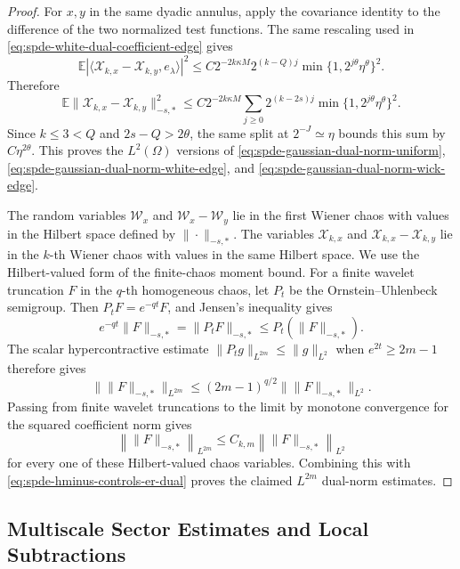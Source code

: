\begin{proof}
For \(x,y\) in the same dyadic annulus, apply the covariance identity to the
difference of the two normalized test functions.  The same rescaling used in
\eqref{eq:spde-white-dual-coefficient-edge} gives
\begin{equation}
  \mathbb E
  \left|
    \langle\mathcal X_{k,x}-\mathcal X_{k,y},e_\lambda\rangle
  \right|^2
  \leq
  C2^{-2k\kappa M}2^{(k-Q)j}
  \min\{1,2^{j\theta}\eta^\theta\}^2 .
  \label{eq:spde-wick-dual-coefficient-edge}
\end{equation}
Therefore
\[
  \mathbb E\|\mathcal X_{k,x}-\mathcal X_{k,y}\|_{-s,*}^2
  \leq
  C2^{-2k\kappa M}
  \sum_{j\geq0}
    2^{(k-2s)j}\min\{1,2^{j\theta}\eta^\theta\}^2 .
\]
Since \(k\leq3<Q\) and \(2s-Q>2\theta\), the same split at
\(2^{-J}\simeq\eta\) bounds this sum by \(C\eta^{2\theta}\).  This proves the
\(L^2(\Omega)\) versions of
\eqref{eq:spde-gaussian-dual-norm-uniform},
\eqref{eq:spde-gaussian-dual-norm-white-edge}, and
\eqref{eq:spde-gaussian-dual-norm-wick-edge}.

The random variables \(\mathcal W_x\) and \(\mathcal W_x-\mathcal W_y\) lie
in the first Wiener chaos with values in the Hilbert space defined by
\(\|\cdot\|_{-s,*}\).  The variables \(\mathcal X_{k,x}\) and
\(\mathcal X_{k,x}-\mathcal X_{k,y}\) lie in the \(k\)-th Wiener chaos with
values in the same Hilbert space.  We use the Hilbert-valued form of the
finite-chaos moment bound.  For a finite wavelet truncation \(F\) in the
\(q\)-th homogeneous chaos, let \(P_t\) be the Ornstein--Uhlenbeck semigroup.
Then \(P_tF=e^{-qt}F\), and Jensen's inequality gives
\[
  e^{-qt}\|F\|_{-s,*}
  =
  \|P_tF\|_{-s,*}
  \leq
  P_t(\|F\|_{-s,*}).
\]
The scalar hypercontractive estimate
\(\|P_t g\|_{L^{2m}}\leq\|g\|_{L^2}\) when
\(e^{2t}\geq 2m-1\) therefore gives
\[
  \|\|F\|_{-s,*}\|_{L^{2m}}
  \leq
  (2m-1)^{q/2}\|\|F\|_{-s,*}\|_{L^2}.
\]
Passing from finite wavelet truncations to the limit by monotone convergence
for the squared coefficient norm gives
\[
  \left\|\|F\|_{-s,*}\right\|_{L^{2m}}
  \leq
  C_{k,m}\left\|\|F\|_{-s,*}\right\|_{L^2}
\]
for every one of these Hilbert-valued chaos variables.  Combining this with
\eqref{eq:spde-hminus-controls-er-dual} proves the claimed \(L^{2m}\)
dual-norm estimates.
\end{proof}

\subsection{Multiscale Sector Estimates and Local Subtractions}
\label{subsec:spde-multiscale-sector-local-subtractions}

